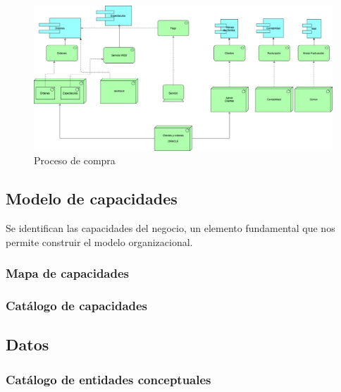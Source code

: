 \documentclass[12pt]{article}
\begin{document}
\begin{figure}[ht]
\centering
\centering
\includegraphics[scale=0.4]{Procesogeneral.jpeg}
\caption{Proceso de compra}
\label{2}
\end{figure}
\FloatBarrier



\subsection{Modelo de capacidades}
Se identifican las capacidades del negocio, un elemento fundamental que nos permite construir el modelo organizacional.



\subsubsection{Mapa de capacidades}


\subsubsection{Catálogo de capacidades}







\subsection{Datos}




\subsubsection{Catálogo de entidades conceptuales}
\end{document}
